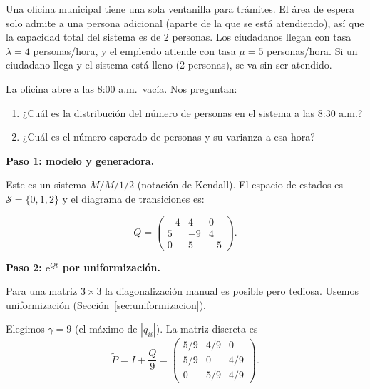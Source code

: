 \documentclass[11pt,a4paper]{article}
\theoremstyle{definition}
\theoremstyle{remark}
\newcommand{\e}{\mathrm{e}}
\begin{document}
\begin{ejemplo}
Una oficina municipal tiene una sola ventanilla para trámites.  El área
de espera solo admite a una persona adicional (aparte de la que se está
atendiendo), así que la capacidad total del sistema es de 2 personas.  Los
ciudadanos llegan con tasa $\lambda = 4$ personas/hora, y el empleado
atiende con tasa $\mu = 5$ personas/hora.  Si un ciudadano llega y el
sistema está lleno (2 personas), se va sin ser atendido.

La oficina abre a las 8:00 a.m.\ vacía.  Nos preguntan:

\begin{enumerate}[label=(\alph*)]
  \item ¿Cuál es la distribución del número de personas en el sistema a
        las 8:30 a.m.?
  \item ¿Cuál es el número esperado de personas y su varianza a esa hora?
\end{enumerate}

\tcblower

\textbf{Paso 1: modelo y generadora.}

Este es un sistema $M/M/1/2$ (notación de Kendall).  El espacio de estados
es $\mathcal{S}=\{0,1,2\}$ y el diagrama de transiciones es:

\begin{center}
\end{center}

\[
  Q = \begin{pmatrix}
    -4 & 4 & 0 \\
    5 & -9 & 4 \\
    0 & 5 & -5
  \end{pmatrix}.
\]

\textbf{Paso 2: $\e^{Qt}$ por uniformización.}

Para una matriz $3\times 3$ la diagonalización manual es posible pero
tediosa.  Usemos uniformización (Sección~\ref{sec:uniformizacion}).

Elegimos $\gamma = 9$ (el máximo de $|q_{ii}|$).  La matriz discreta es
\[
  \tilde{P} = I + \frac{Q}{9}
  = \begin{pmatrix}
    5/9 & 4/9 & 0 \\
    5/9 & 0   & 4/9 \\
    0   & 5/9 & 4/9
  \end{pmatrix}.
\]


\end{ejemplo}
\end{document}
